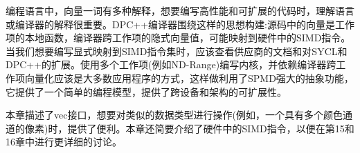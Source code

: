 
编程语言中，向量一词有多种解释，想要编写高性能和可扩展的代码时，理解语言或编译器的解释很重要。DPC++编译器围绕这样的思想构建:源码中的向量是工作项的本地函数，编译器跨工作项的隐式向量值，可能映射到硬件中的SIMD指令。当我们想要编写显式映射到SIMD指令集时，应该查看供应商的文档和对SYCL和DPC++的扩展。使用多个工作项(例如ND-Range)编写内核，并依赖编译器跨工作项向量化应该是大多数应用程序的方式，这样做利用了SPMD强大的抽象功能，它提供了一个简单的编程模型，提供了跨设备和架构的可扩展性。\par

本章描述了vec接口，想要对类似的数据类型进行操作(例如，一个具有多个颜色通道的像素)时，提供了便利。本章还简要介绍了硬件中的SIMD指令，以便在第15和16章中进行更详细的讨论。\par

\newpage